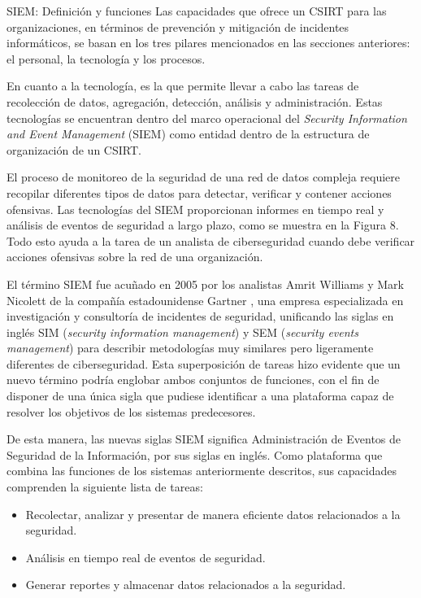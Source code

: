     \begin{section}{SIEM: Definición y funciones}
    Las capacidades que ofrece un CSIRT para las organizaciones, en términos de prevención y mitigación de incidentes informáticos, se basan en los tres pilares mencionados en las secciones anteriores: el personal, la tecnología y los procesos. \par
    En cuanto a la tecnología, es la que permite llevar a cabo las tareas de recolección de datos, agregación, detección, análisis y administración. Estas tecnologías se encuentran dentro del marco operacional del \textit{Security Information and Event Management} (SIEM) como entidad dentro de la estructura de organización de un CSIRT. \par
    El proceso de monitoreo de la seguridad de una red de datos compleja requiere recopilar diferentes tipos de datos para detectar, verificar y contener acciones ofensivas. Las tecnologías del SIEM proporcionan informes en tiempo real y análisis de eventos de seguridad a largo plazo, como se muestra en la Figura 8. Todo esto ayuda a la tarea de un analista de ciberseguridad cuando debe verificar acciones ofensivas sobre la red de una organización. \par
    El término SIEM fue acuñado en 2005 por los analistas Amrit Williams y Mark Nicolett de la compañía estadounidense Gartner \cite{def_siem}, una empresa especializada en investigación y consultoría de incidentes de seguridad, unificando las siglas en inglés SIM (\textit{security information management}) y SEM (\textit{security events management}) para describir metodologías muy similares pero ligeramente diferentes de ciberseguridad. Esta superposición de tareas hizo evidente que un nuevo término podría englobar ambos conjuntos de funciones, con el fin de disponer de una única sigla que pudiese identificar a una plataforma capaz de resolver los objetivos de los sistemas predecesores. \par
    De esta manera, las nuevas siglas SIEM significa Administración de Eventos de Seguridad de la Información, por sus siglas en inglés. Como plataforma que combina las funciones de los sistemas anteriormente descritos, sus capacidades comprenden la siguiente lista de tareas:
    \begin{itemize}
        \item Recolectar, analizar y presentar de manera eficiente datos relacionados a la seguridad.
        \item Análisis en tiempo real de eventos de seguridad.
        \item Generar reportes y almacenar datos relacionados a la seguridad.

\end{itemize}
\end{section}
